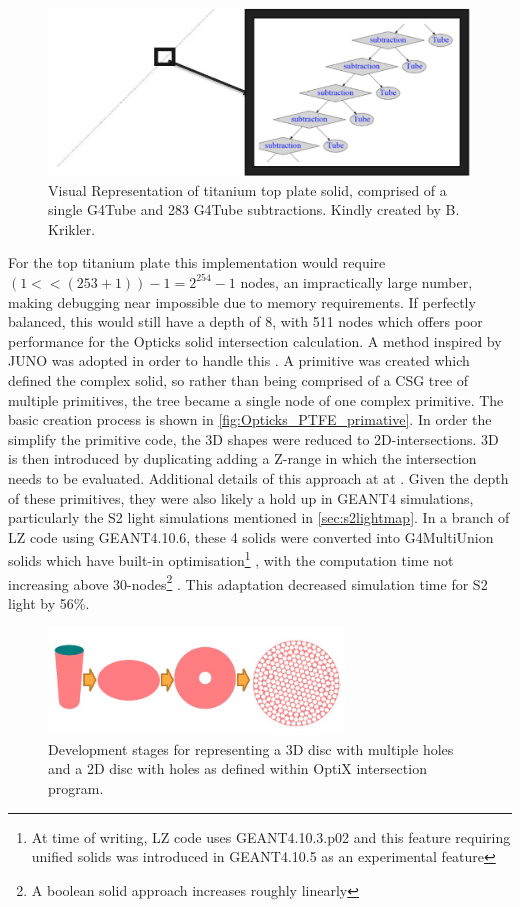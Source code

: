 \begin{figure}
\includegraphics[width=\textwidth]{Figures/Simulations/unbalanced_ptfe.png}
\centering
\caption{Visual Representation of titanium top plate solid, comprised of a single G4Tube and 283 G4Tube subtractions. Kindly created by B. Krikler.}
\label{fig:Opticks_unbalanced_shape}
\end{figure}
For the top titanium plate this implementation would require $(1 << (253 + 1))-1 = 2^{254} - 1$ nodes, an impractically large number, making debugging near impossible due to memory requirements.
If perfectly balanced, this would still have a depth of 8, with 511 nodes which offers poor performance for the Opticks solid intersection calculation.
A method inspired by JUNO was adopted in order to handle this \cite{Opticks_CHEP_2021_ref}.
A primitive was created which defined the complex solid, so rather than being comprised of a CSG tree of multiple primitives, the tree became a single node of one complex primitive.
The basic creation process is shown in \autoref{fig:Opticks_PTFE_primative}.
In order the simplify the primitive code, the 3D shapes were reduced to 2D-intersections.
3D is then introduced by duplicating adding a Z-range in which the intersection needs to be evaluated.
Additional details of this approach at at \cite{optix_primitive_code_ref}.
Given the depth of these primitives, they were also likely a hold up in GEANT4 simulations, particularly the S2 light simulations mentioned in \autoref{sec:s2lightmap}.
In a branch of LZ code using GEANT4.10.6, these 4 solids were converted into G4MultiUnion solids which have built-in optimisation\footnote{At time of writing, LZ code uses GEANT4.10.3.p02 and this feature requiring unified solids was introduced in GEANT4.10.5 as an experimental feature} \cite{multiunion_ref}, with the computation time not increasing above 30-nodes\footnote{A boolean solid approach increases roughly linearly} \cite{multiunion_improvement_ref}.
This adaptation decreased simulation time for S2 light by 56\%.
\begin{figure}
\includegraphics[width=0.7\textwidth]{Figures/Simulations/opticks_PTFE_primative.png}
\centering
\caption{Development stages for representing a 3D disc with multiple holes and a 2D disc with holes as defined within OptiX intersection program.}
\label{fig:Opticks_PTFE_primative}
\end{figure}

